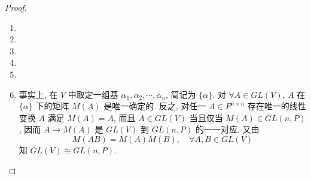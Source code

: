 \documentclass[../../main.tex]{subfiles}
\begin{document}
\begin{proof}
\begin{enumerate}
\item 

\item 

\item 

\item 

\item 

\item 事实上, 在 \( V \) 中取定一组基 \( \alpha_1,\alpha_2,\cdots,\alpha_n \), 简记为 \( \{\alpha\} \). 对 \( \forall A \in GL(V) \), \( A \) 在 \( \{\alpha\} \) 下的矩阵 \( M(A) \) 是唯一确定的. 反之, 对任一 \( A \in P^{n \times n} \) 存在唯一的线性变换 \( A \) 满足 \( M(A) = A \), 而且 \( A \in GL(V) \) 当且仅当 \( M(A) \in GL(n,P) \), 因而 \( A \to M(A) \) 是 \( GL(V) \) 到 \( GL(n,P) \) 的一一对应, 又由
\[
M(AB) = M(A)M(B), \quad \forall A,B \in GL(V)
\]
知 \( GL(V) \cong GL(n,P) \).
\end{enumerate}
\end{proof}
\end{document}
